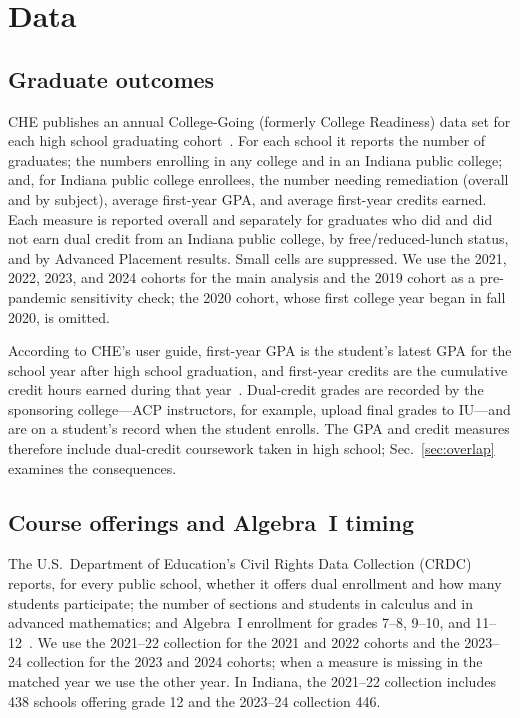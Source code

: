 \documentclass[aps,prd,reprint,superscriptaddress,nofootinbib,floatfix]{revtex4-2}
\begin{document}
\section{Data}\label{sec:data}

\subsection{Graduate outcomes}

CHE publishes an annual College-Going (formerly College Readiness) data set for each high school graduating cohort~\cite{chedata}. For each school it reports the number of graduates; the numbers enrolling in any college and in an Indiana public college; and, for Indiana public college enrollees, the number needing remediation (overall and by subject), average first-year GPA, and average first-year credits earned. Each measure is reported overall and separately for graduates who did and did not earn dual credit from an Indiana public college, by free/reduced-lunch status, and by Advanced Placement results. Small cells are suppressed. We use the 2021, 2022, 2023, and 2024 cohorts for the main analysis and the 2019 cohort as a pre-pandemic sensitivity check; the 2020 cohort, whose first college year began in fall 2020, is omitted.

According to CHE's user guide, first-year GPA is the student's latest GPA for the school year after high school graduation, and first-year credits are the cumulative credit hours earned during that year~\cite{cheguide}. Dual-credit grades are recorded by the sponsoring college---ACP instructors, for example, upload final grades to IU---and are on a student's record when the student enrolls. The GPA and credit measures therefore include dual-credit coursework taken in high school; Sec.~\ref{sec:overlap} examines the consequences.

\subsection{Course offerings and Algebra~I timing}

The U.S.\ Department of Education's Civil Rights Data Collection (CRDC) reports, for every public school, whether it offers dual enrollment and how many students participate; the number of sections and students in calculus and in advanced mathematics; and Algebra~I enrollment for grades 7--8, 9--10, and 11--12~\cite{crdc}. We use the 2021--22 collection for the 2021 and 2022 cohorts and the 2023--24 collection for the 2023 and 2024 cohorts; when a measure is missing in the matched year we use the other year. In Indiana, the 2021--22 collection includes 438 schools offering grade 12 and the 2023--24 collection 446.
\end{document}
